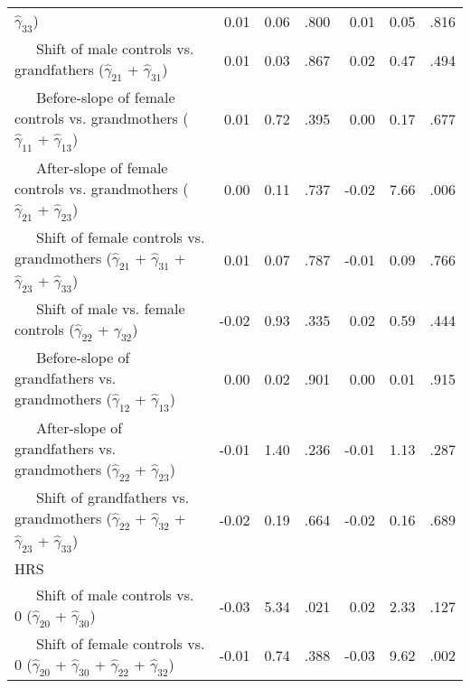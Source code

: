 \documentclass[
  english,
  man,floatsintext]{apa7}
\newenvironment{lltable}{\begin{landscape}\begin{center}\begin{ThreePartTable}}{\end{ThreePartTable}\end{center}\end{landscape}}
\begin{document}
\begin{lltable}
{\begin{longtable}{lrrrrrr}
                              $\hat{\gamma}_{33}$) \textcolor{white}{L} & 0.01 & 0.06 & .800 & 0.01 & 0.05 & .816\\
\ \ \ Shift of male controls vs. grandfathers 
                              ($\hat{\gamma}_{21}$ + $\hat{\gamma}_{31}$) \textcolor{white}{L} & 0.01 & 0.03 & .867 & 0.02 & 0.47 & .494\\
\ \ \ Before-slope of female controls vs. grandmothers 
                              ($\hat{\gamma}_{11}$ + $\hat{\gamma}_{13}$) \textcolor{white}{L} & 0.01 & 0.72 & .395 & 0.00 & 0.17 & .677\\
\ \ \ After-slope of female controls vs. grandmothers 
                              ($\hat{\gamma}_{21}$ + $\hat{\gamma}_{23}$) \textcolor{white}{L} & 0.00 & 0.11 & .737 & -0.02 & 7.66 & .006\\
\ \ \ Shift of female controls vs. grandmothers 
                              ($\hat{\gamma}_{21}$ + $\hat{\gamma}_{31}$ + 
                              $\hat{\gamma}_{23}$ + $\hat{\gamma}_{33}$) \textcolor{white}{L} & 0.01 & 0.07 & .787 & -0.01 & 0.09 & .766\\
\ \ \ Shift of male vs. female controls 
                              ($\hat{\gamma}_{22}$ + $\hat{\gamma}_{32}$) \textcolor{white}{L} & -0.02 & 0.93 & .335 & 0.02 & 0.59 & .444\\
\ \ \ Before-slope of grandfathers vs. grandmothers 
                              ($\hat{\gamma}_{12}$ + $\hat{\gamma}_{13}$) \textcolor{white}{L} & 0.00 & 0.02 & .901 & 0.00 & 0.01 & .915\\
\ \ \ After-slope of grandfathers vs. grandmothers 
                              ($\hat{\gamma}_{22}$ + $\hat{\gamma}_{23}$) \textcolor{white}{L} & -0.01 & 1.40 & .236 & -0.01 & 1.13 & .287\\
\ \ \ Shift of grandfathers vs. grandmothers 
                              ($\hat{\gamma}_{22}$ + $\hat{\gamma}_{32}$ + 
                              $\hat{\gamma}_{23}$ + $\hat{\gamma}_{33}$) \textcolor{white}{L} & -0.02 & 0.19 & .664 & -0.02 & 0.16 & .689\\
HRS &  &  &  &  &  & \\
\ \ \ Shift of male controls vs. 0 ($\hat{\gamma}_{20}$ + 
                              $\hat{\gamma}_{30}$) \textcolor{white}{H} & -0.03 & 5.34 & .021 & 0.02 & 2.33 & .127\\
\ \ \ Shift of female controls vs. 0 ($\hat{\gamma}_{20}$ + 
                              $\hat{\gamma}_{30}$ + $\hat{\gamma}_{22}$ + 
                              $\hat{\gamma}_{32}$) \textcolor{white}{H} & -0.01 & 0.74 & .388 & -0.03 & 9.62 & .002\\

\end{longtable}}
\end{lltable}
\end{document}
